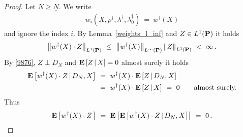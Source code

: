 \begin{proof}
  Let
  $N\ge\underline{N}$.
  We write
  \begin{gather*}
  w_i(X,\rho^\dagger,\lambda^\dagger,\lambda_0^\dagger)
  \ 
  =
  \ 
  w^\dagger(X)
  \end{gather*}
  and ignore the index $i$.
  By Lemma~\ref{weights_l_inf} and 
  $Z\in L^1(\P)$
  it holds
  \begin{gather}
    \label{9876}
    \norm{
  w^\dagger(X)\cdot Z
    }_{L^1(\P)}
    \ 
  \le
    \ 
  \norm{w^\dagger(X)}_{L^\infty(\P)}
  \norm{Z}_{L^1(\P)}
  \ 
  <
  \ 
  \infty
  \,.
  \end{gather}
  By 
  \eqref{9876},
  $Z\perp D_N$
  and
  $
\E
\left[
  Z
  \,
  |
  \, 
  X
\right]
= 0
  $
  almost surely
  it holds 
  \begin{align*}
    \E
  \left[
  w^\dagger(X)
  \cdot
  Z
  \,
  |
  \,
  D_N,X
  \right]
  &
  \ 
  =
  \ 
  w^\dagger(X)
  \cdot
  \E
  \left[
  Z
  \,
  |
  \,
  D_N,X
  \right]
  \\
  &
  \ 
  =
  \ 
  w^\dagger(X)
  \cdot
  \E
  \left[
  Z
  \,
  |
  \,
  X
  \right]
  \
  =
  \ 
  0
  \qquad
  \text{almost surely.}
  \end{align*}
  Thus
  \begin{gather*}
    \E
    \left[
  w^\dagger(X)
  \cdot
  Z
  \,
    \right]
    \ 
    =
    \ 
    \E
    \left[
 \E
  \left[
  w^\dagger(X)
  \cdot
  Z
  \,
  |
  \,
  D_N,X
  \right]
    \right]
    \ 
    =
    \ 
    0
    \,.
     \end{gather*}
\end{proof}

